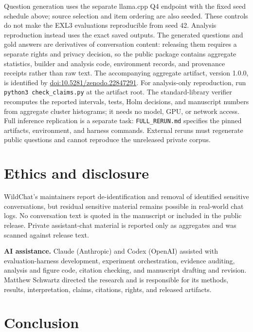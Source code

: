 \documentclass[11pt]{article}
\newcommand{\q}[1]{\texttt{#1}}
\newcommand{\PtwoArtifactDOI}{10.5281/zenodo.22847291}
\begin{document}
Question generation uses the separate llama.cpp Q4 endpoint with the fixed
seed schedule above; source selection and item ordering are also seeded.
These controls do not make the EXL3 evaluations reproducible from seed 42.
Analysis reproduction instead uses the exact saved outputs. The generated
questions and gold answers are
derivatives of conversation content: releasing them requires a separate rights
and privacy decision, so the public package contains aggregate statistics,
builder and analysis code, environment records, and provenance receipts rather
than raw text.
The accompanying aggregate artifact, version 1.0.0, is identified by
\href{https://doi.org/\PtwoArtifactDOI}{doi:\PtwoArtifactDOI}.
For analysis-only reproduction, run \q{python3 check\_claims.py} at the artifact
root. The standard-library verifier recomputes the reported intervals, tests,
Holm decisions, and manuscript numbers from aggregate cluster histograms;
it needs no model, GPU, or network access. Full inference replication is a
separate task: \q{FULL\_RERUN.md} specifies the pinned artifacts, environment,
and harness commands. External reruns must regenerate public questions and
cannot reproduce the unreleased private corpus.

\section{Ethics and disclosure}

WildChat's maintainers report de-identification and removal of identified
sensitive conversations, but residual sensitive material remains possible in
real-world chat logs. No conversation text is quoted in the manuscript or
included in the public release. Private assistant-chat material is reported
only as aggregates and was scanned against release text.

\noindent\textbf{AI assistance.} Claude (Anthropic) and Codex (OpenAI)
assisted with evaluation-harness development, experiment orchestration,
evidence auditing, analysis and figure code, citation checking, and
manuscript drafting and revision. Matthew Schwartz directed the research and
is responsible for its methods, results, interpretation, claims, citations,
rights, and released artifacts.

\section{Conclusion}
\end{document}
